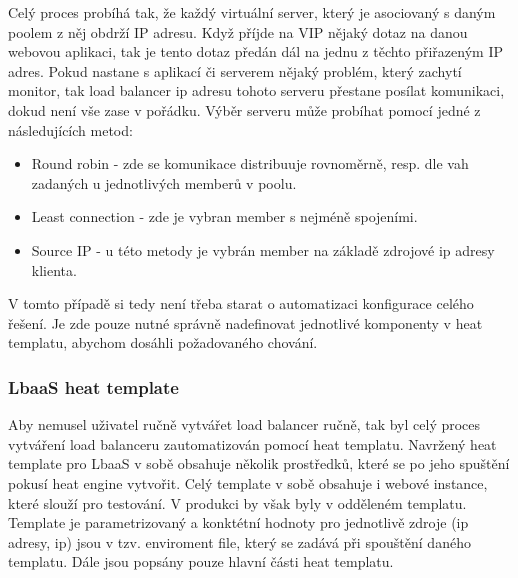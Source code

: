 Celý proces probíhá tak, že každý virtuální server, který je asociovaný s daným poolem z něj obdrží IP adresu. Když příjde na VIP nějaký dotaz na danou webovou aplikaci, tak je tento dotaz předán dál na jednu z těchto přiřazeným IP adres. Pokud nastane s aplikací či serverem nějaký problém, který zachytí monitor, tak load balancer ip adresu tohoto serveru přestane posílat komunikaci, dokud není vše zase v pořádku. Výběr serveru může probíhat pomocí jedné z následujících metod:

\begin{itemize}
\item Round robin - zde se komunikace distribuuje rovnoměrně, resp. dle vah zadaných u jednotlivých memberů v poolu.
\item Least connection - zde je vybran member s nejméně spojeními.
\item Source IP - u této metody je vybrán member na základě zdrojové ip adresy klienta.
\end{itemize}

V tomto případě si tedy není třeba starat o automatizaci konfigurace celého řešení. Je zde pouze nutné správně nadefinovat jednotlivé komponenty v heat templatu, abychom dosáhli požadovaného chování.

\subsubsection{LbaaS heat template}

Aby nemusel uživatel ručně vytvářet load balancer ručně, tak byl celý proces vytváření load balanceru zautomatizován pomocí heat templatu. Navržený heat template pro LbaaS v sobě obsahuje několik  prostředků, které se po jeho spuštění pokusí heat engine vytvořit. Celý template v sobě obsahuje i webové instance, které slouží pro testování. V produkci by však byly v odděleném templatu. Template je parametrizovaný a konktétní hodnoty pro jednotlivě zdroje (ip adresy, ip) jsou v tzv. enviroment file, který se zadává při spouštění daného templatu. Dále jsou popsány pouze hlavní části heat templatu.

